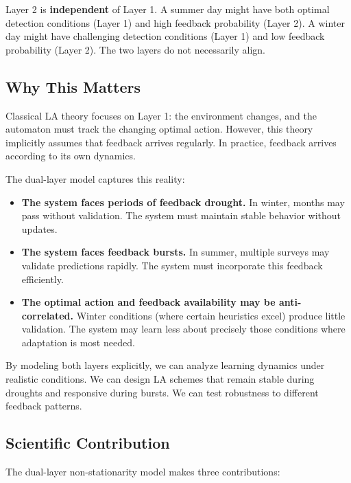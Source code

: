 \documentclass[11pt,a4paper]{article}
\begin{document}
Layer 2 is \textbf{independent} of Layer 1. A summer day might have both optimal detection conditions (Layer 1) and high feedback probability (Layer 2). A winter day might have challenging detection conditions (Layer 1) and low feedback probability (Layer 2). The two layers do not necessarily align.

\subsection{Why This Matters}

Classical LA theory focuses on Layer 1: the environment changes, and the automaton must track the changing optimal action. However, this theory implicitly assumes that feedback arrives regularly. In practice, feedback arrives according to its own dynamics.

The dual-layer model captures this reality:
\begin{itemize}
    \item \textbf{The system faces periods of feedback drought.} In winter, months may pass without validation. The system must maintain stable behavior without updates.

    \item \textbf{The system faces feedback bursts.} In summer, multiple surveys may validate predictions rapidly. The system must incorporate this feedback efficiently.

    \item \textbf{The optimal action and feedback availability may be anti-correlated.} Winter conditions (where certain heuristics excel) produce little validation. The system may learn less about precisely those conditions where adaptation is most needed.
\end{itemize}

By modeling both layers explicitly, we can analyze learning dynamics under realistic conditions. We can design LA schemes that remain stable during droughts and responsive during bursts. We can test robustness to different feedback patterns.

\subsection{Scientific Contribution}

The dual-layer non-stationarity model makes three contributions:
\end{document}
